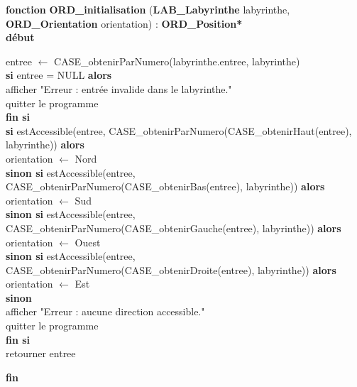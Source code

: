 \documentclass[a4paper, 11pt]{article}
\begin{document}
\noindent\textbf{fonction} \textbf{ORD\_initialisation} (\textbf{LAB\_Labyrinthe} labyrinthe, \textbf{ORD\_Orientation} orientation) : \textbf{ORD\_Position*}\\
\textbf{début}
\begin{flushleft}
    \hspace*{1cm}entree $\gets$ CASE\_obtenirParNumero(labyrinthe.entree, labyrinthe)\\
    \hspace*{1cm}\textbf{si} entree = NULL \textbf{alors}\\
    \hspace*{2cm}afficher "Erreur : entrée invalide dans le labyrinthe."\\
    \hspace*{2cm}quitter le programme\\
    \hspace*{1cm}\textbf{fin si}\\
    \hspace*{1cm}\textbf{si} estAccessible(entree, CASE\_obtenirParNumero(CASE\_obtenirHaut(entree), labyrinthe)) \textbf{alors}\\
    \hspace*{2cm}orientation $\gets$ Nord\\
    \hspace*{1cm}\textbf{sinon si} estAccessible(entree, CASE\_obtenirParNumero(CASE\_obtenirBas(entree), labyrinthe)) \textbf{alors}\\
    \hspace*{2cm}orientation $\gets$ Sud\\
    \hspace*{1cm}\textbf{sinon si} estAccessible(entree, CASE\_obtenirParNumero(CASE\_obtenirGauche(entree), labyrinthe)) \textbf{alors}\\
    \hspace*{2cm}orientation $\gets$ Ouest\\
    \hspace*{1cm}\textbf{sinon si} estAccessible(entree, CASE\_obtenirParNumero(CASE\_obtenirDroite(entree), labyrinthe)) \textbf{alors}\\
    \hspace*{2cm}orientation $\gets$ Est\\
    \hspace*{1cm}\textbf{sinon}\\
    \hspace*{2cm}afficher "Erreur : aucune direction accessible."\\
    \hspace*{2cm}quitter le programme\\
    \hspace*{1cm}\textbf{fin si}\\
    \hspace*{1cm}retourner entree
\end{flushleft}
\textbf{fin}\\ 
\end{document}
